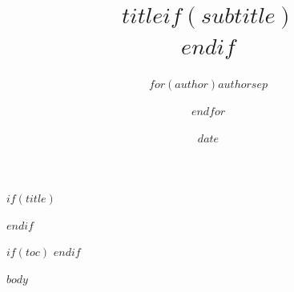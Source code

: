 \documentclass[12pt, $if(papersize)$$papersize$,$endif$oneside]{article}
\title{$title$$if(subtitle)$\\\vspace{0.5em}{\large $subtitle$}$endif$}
\author{$for(author)$$author$$sep$ \and $endfor$}
\date{$date$}
\begin{document}
$if(title)$
\maketitle
$endif$

$if(toc)$
\tableofcontents
\newpage
$endif$

$body$
\end{document}
